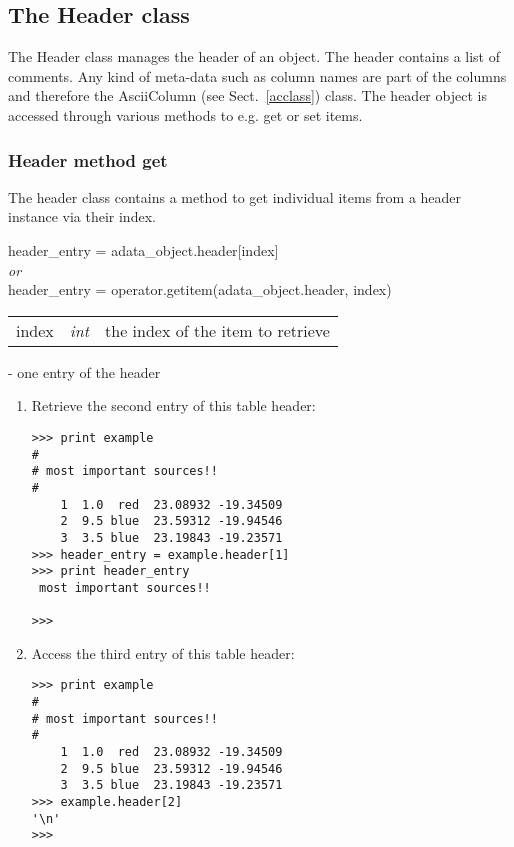 %
%
\subsection{The Header class}
\label{hclass}
The Header class manages the header of an \ad object.
The header contains a list of comments.
Any kind of meta-data such as column names are part of the
columns and therefore the AsciiColumn (see Sect.\ \ref{acclass})
class. The header object is accessed through various
methods to e.g. get or set items.

\subsubsection{Header method get}
\label{ahe_get}
%
The header class contains a method to get individual items from a header
instance via their index.

header\_entry = adata\_object.header[index]\\
{\it or}\\
header\_entry = operator.getitem(adata\_object.header, index)

\begin{tabular}{lcl}
index &{\it int}& the index of the item to retrieve\\
\end{tabular}

- one entry of the header

\begin{enumerate}
\item Retrieve the second entry of this table header:
\begin{small}
\begin{verbatim}
>>> print example
#
# most important sources!!
#
    1  1.0  red  23.08932 -19.34509
    2  9.5 blue  23.59312 -19.94546
    3  3.5 blue  23.19843 -19.23571
>>> header_entry = example.header[1]
>>> print header_entry
 most important sources!!

>>>
\end{verbatim}
\end{small}
\item Access the third entry of this table header:
\begin{small}
\begin{verbatim}
>>> print example
#
# most important sources!!
#
    1  1.0  red  23.08932 -19.34509
    2  9.5 blue  23.59312 -19.94546
    3  3.5 blue  23.19843 -19.23571
>>> example.header[2]
'\n'
>>>
\end{verbatim}
\end{small}
\end{enumerate}


